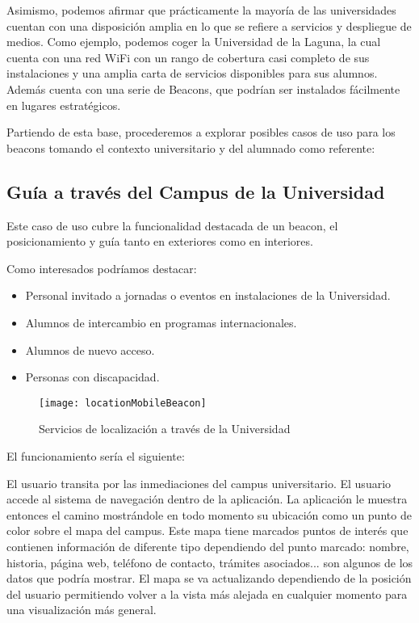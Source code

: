 Asimismo, podemos afirmar que prácticamente la mayoría de las universidades cuentan con una disposición amplia en lo que se refiere a servicios y despliegue de medios. Como ejemplo, podemos coger la Universidad de la Laguna, la cual cuenta con una red WiFi con un rango de cobertura casi completo de sus instalaciones y una amplia carta de servicios disponibles para sus alumnos. Además cuenta con una serie de Beacons, que podrían ser instalados fácilmente en lugares estratégicos. 

Partiendo de esta base, procederemos a explorar posibles casos de uso para los beacons tomando el contexto universitario y del alumnado como referente:

\subsection{Guía a través del Campus de la Universidad}

Este caso de uso cubre la funcionalidad destacada de un beacon, el posicionamiento y guía tanto en exteriores como en interiores. 

Como interesados podríamos destacar: 

\begin{itemize}
\item Personal invitado a jornadas o eventos en instalaciones de la Universidad.
\item Alumnos de intercambio en programas internacionales.
\item Alumnos de nuevo acceso.
\item Personas con discapacidad.
\end{itemize}

\begin{figure}[h]
	\centering
	\texttt{[image: locationMobileBeacon]}
	\caption{Servicios de localización a través de la Universidad}
	\label{fig:beaconLocation}
\end{figure}

El funcionamiento sería el siguiente: 


El usuario transita por las inmediaciones del campus universitario. El usuario accede al sistema de navegación dentro de la aplicación. La aplicación le muestra entonces el camino mostrándole en todo momento su ubicación como un punto de color sobre el mapa del campus. Este mapa tiene marcados puntos de interés que contienen información de diferente tipo dependiendo del punto marcado: nombre, historia, página web, teléfono de contacto, trámites asociados... son algunos de los datos que podría mostrar. El mapa se va actualizando dependiendo de la posición del usuario permitiendo volver a la vista más alejada en cualquier momento para una visualización más general.


